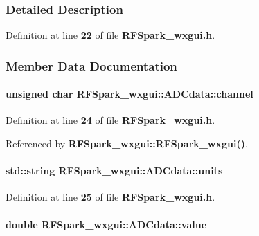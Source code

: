 \subsubsection{Detailed Description}


Definition at line {\bf 22} of file {\bf R\+F\+Spark\+\_\+wxgui.\+h}.



\subsubsection{Member Data Documentation}
\paragraph[{channel}]{\setlength{\rightskip}{0pt plus 5cm}unsigned char R\+F\+Spark\+\_\+wxgui\+::\+A\+D\+Cdata\+::channel}\label{structRFSpark__wxgui_1_1ADCdata_a3983003f4bbc31a5af334220b5aae202}


Definition at line {\bf 24} of file {\bf R\+F\+Spark\+\_\+wxgui.\+h}.



Referenced by {\bf R\+F\+Spark\+\_\+wxgui\+::\+R\+F\+Spark\+\_\+wxgui()}.

\paragraph[{units}]{\setlength{\rightskip}{0pt plus 5cm}std\+::string R\+F\+Spark\+\_\+wxgui\+::\+A\+D\+Cdata\+::units}\label{structRFSpark__wxgui_1_1ADCdata_a52da8d683ccea826d5b790dbfd4e95b2}


Definition at line {\bf 25} of file {\bf R\+F\+Spark\+\_\+wxgui.\+h}.

\paragraph[{value}]{\setlength{\rightskip}{0pt plus 5cm}double R\+F\+Spark\+\_\+wxgui\+::\+A\+D\+Cdata\+::value}\label{structRFSpark__wxgui_1_1ADCdata_a2c685408d5ed6b4d6a966bed0ec3e393}


